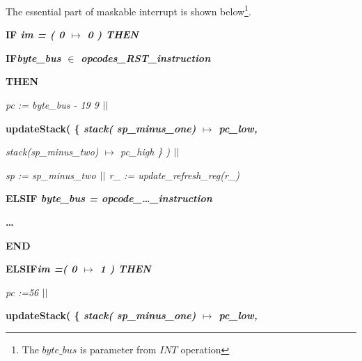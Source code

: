 \documentclass[11pt]{article} %
\begin{document}
The essential part of maskable interrupt is shown below\footnote{ The
 $\mathit{byte\_bus}$ is parameter from  $\mathit{INT}$ operation }. 
 


\begin{sloppypar}

\hspace*{0.00in}\bf IF \it im \rm = \rm ( \rm 0  $\mapsto$  \rm 0 \rm ) \bf THEN  

\hspace*{0.10in}\bf IF\hspace*{0.10in}\it byte\_bus \rm $\in$  \it opcodes\_RST\_instruction

\hspace*{0.10in}\bf THEN\hspace*{1.05in}

\hspace*{0.40in}\it pc \rm := \it byte\_bus \rm - \rm 1\rm 9\rm
9\hspace*{0.10in} $\mbox{$\mid\mid$}$

\hspace*{0.40in}\bf updateStack\rm ( \rm \{ \it stack\rm ( \it
sp\_minus\_one\rm )  $\mapsto$  \it pc\_low\rm ,

\hspace*{0.40in}\it stack\rm (\it sp\_minus\_two\rm )  $\mapsto$  \it pc\_high
\rm \} \rm )  $\mbox{$\mid\mid$}$

\hspace*{0.40in}\it sp \rm := \it sp\_minus\_two  $\mbox{$\mid\mid$}$ \hspace*{0.10in}\it
r\_ \rm := \it update\_refresh\_reg\rm (\it r\_\rm )

\hspace*{0.10in}\bf ELSIF \it byte\_bus \rm = \it opcode\_\ldots\_instruction

\hspace*{0.40in}\bf \ldots 

\hspace*{0.10in}\bf END

\hspace*{0.00in}\bf ELSIF\hspace*{0.10in}\it im \rm =\hspace*{0.10in}\rm ( \rm
0  $\mapsto$  \rm 1 \rm ) \bf THEN

\hspace*{0.10in}\it pc \rm :=\hspace*{0.10in}\rm 5\rm 6  \hspace*{0.80in}
$\mbox{$\mid\mid$}$

\hspace*{0.10in}\bf updateStack\rm ( \rm \{ \it stack\rm (\it
sp\_minus\_one\rm )  $\mapsto$  \it pc\_low\rm ,


\end{sloppypar}
\end{document}
